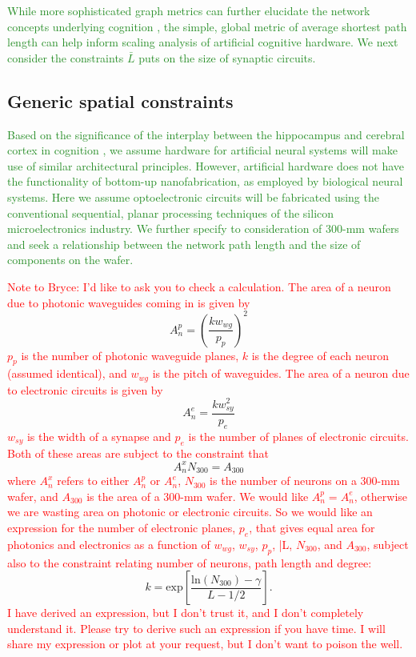 \documentclass[twocolumn]{article}
\begin{document}
\textcolor{ForestGreen}{While more sophisticated graph metrics can further elucidate the network concepts underlying cognition \cite{busp2009,sp2010}, the simple, global metric of average shortest path length can help inform scaling analysis of artificial cognitive hardware. We next consider the constraints $\bar{L}$ puts on the size of synaptic circuits.}

\subsection{Generic spatial constraints}
\label{sec:spatial_constraints}
\textcolor{ForestGreen}{Based on the significance of the interplay between the hippocampus and cerebral cortex in cognition \cite{frbu2016}, we assume hardware for artificial neural systems will make use of similar architectural principles. However, artificial hardware does not have the functionality of bottom-up nanofabrication, as employed by biological neural systems. Here we assume optoelectronic circuits will be fabricated using the conventional sequential, planar processing techniques of the silicon microelectronics industry. We further specify to consideration of 300-mm wafers and seek a relationship between the network path length and the size of components on the wafer.}

\textcolor{red}{Note to Bryce: I'd like to ask you to check a calculation. The area of a neuron due to photonic waveguides coming in is given by \cite{ke1982}}
\begin{equation}
A_n^p = \left( \frac{k w_{wg}}{p_p} \right)^2
\end{equation}
\textcolor{red}{$p_p$ is the number of photonic waveguide planes, $k$ is the degree of each neuron (assumed identical), and $w_{wg}$ is the pitch of waveguides. The area of a neuron due to electronic circuits is given by}
\begin{equation}
A_n^e = \frac{k w_{sy}^2}{p_e}
\end{equation}
\textcolor{red}{$w_{sy}$ is the width of a synapse and $p_e$ is the number of planes of electronic circuits. Both of these areas are subject to the constraint that}
\begin{equation}
A_n^x N_{300} = A_{300}
\end{equation}
\textcolor{red}{where $A_n^x$ refers to either $A_n^p$ or $A_n^e$, $N_{300}$ is the number of neurons on a 300-mm wafer, and $A_{300}$ is the area of a 300-mm wafer. We would like $A_n^p = A_n^e$, otherwise we are wasting area on photonic or electronic circuits. So we would like an expression for the number of electronic planes, $p_e$, that gives equal area for photonics and electronics as a function of $w_{wg}$, $w_{sy}$, $p_p$, \bar{L}, $N_{300}$, and $A_{300}$, subject also to the constraint relating number of neurons, path length and degree:}
\begin{equation}
k = \mathrm{exp} \left[ \frac{\mathrm{ln}(N_{\mathrm{300}})-\gamma}{L-1/2} \right].
\end{equation}
\textcolor{red}{I have derived an expression, but I don't trust it, and I don't completely understand it. Please try to derive such an expression if you have time. I will share my expression or plot at your request, but I don't want to poison the well.}
\end{document}
